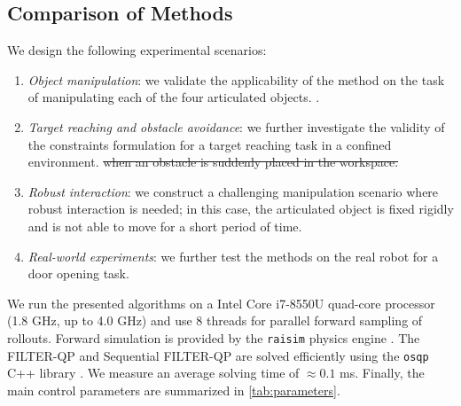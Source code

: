 

\subsection{Comparison of Methods}
We design the following experimental scenarios:
\begin{enumerate}
    \item \textit{Object manipulation}: we validate the applicability of the method on the task of manipulating each of the four articulated objects. . 
    \item \textit{Target reaching and obstacle avoidance}: we further investigate the validity of the constraints formulation for a target reaching task in a confined environment.  \sout{when an obstacle is suddenly placed in the workspace.}
    \item \textit{Robust interaction}: we construct a challenging manipulation scenario where robust interaction is needed; in this case, the articulated object is fixed rigidly and is not able to move for a short period of time.
    \item \textit{Real-world experiments}: we further test the methods on the real robot for a door opening task. 
\end{enumerate}

We run the presented algorithms on a Intel Core i7-8550U quad-core processor (1.8 GHz, up to 4.0 GHz) and use 8 threads for parallel forward sampling of rollouts. Forward simulation is provided by the \texttt{raisim} physics engine \cite{raisim}. The FILTER-QP and Sequential FILTER-QP are solved efficiently using the \texttt{osqp} C++ library \cite{osqp}. We measure an average solving time of $\approx 0.1$ ms. Finally, the main control parameters are summarized in \tab \ref{tab:parameters}.  


